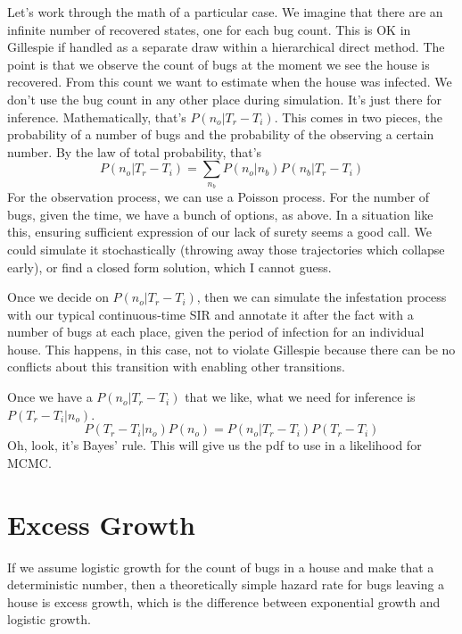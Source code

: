 \documentclass{article}
\begin{document}
Let's work through the math of a particular case. We imagine that
there are an infinite number of recovered states, one for each bug count.
This is OK in Gillespie if handled as a separate draw within a
hierarchical direct method. The point is that we observe the count of bugs
at the moment we see the house is recovered. From this count we want
to estimate when the house was infected. We don't use the bug count
in any other place during simulation. It's just there for inference.
Mathematically, that's $P(n_o | T_r-T_i)$. This comes in two pieces,
the probability of a number of bugs and the probability of the observing
a certain number. By the law of total probability, that's
\begin{equation}
  P(n_o|T_r-T_i)=\sum_{n_b}P(n_o|n_b)P(n_b|T_r-T_i)
\end{equation}
For the observation process, we can use a Poisson process.
For the number of bugs, given the time, we have a bunch of
options, as above. In a situation like this, ensuring 
sufficient expression of our lack of surety seems a good call.
We could simulate it stochastically (throwing away those trajectories
which collapse early), or find a closed form solution, which I cannot
guess.

Once we decide on $P(n_o|T_r-T_i)$, then we can simulate the
infestation process with our typical continuous-time SIR
and annotate it after the fact with a number of bugs at each place,
given the period of infection for an individual house.
This happens, in this case, not to violate Gillespie because there
can be no conflicts about this transition with enabling other
transitions.

Once we have a $P(n_o|T_r-T_i)$ that we like, what we need for
inference is $P(T_r-T_i|n_o)$.
\begin{equation}
  P(T_r-T_i|n_o)P(n_o)=P(n_o|T_r-T_i)P(T_r-T_i)
\end{equation}
Oh, look, it's Bayes' rule. This will give us the pdf to use
in a likelihood for MCMC.


\section{Excess Growth}
If we assume logistic growth for the count of bugs in a house
and make that a deterministic number, then a theoretically
simple hazard rate for bugs leaving a house is excess growth,
which is the difference between exponential growth and logistic growth.
\end{document}

